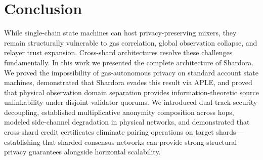 \documentclass[sigconf,nonacm]{acmart}
\begin{document}
\section{Conclusion}
While single-chain state machines can host privacy-preserving mixers, they remain structurally vulnerable to gas correlation, global observation collapse, and relayer trust expansion. Cross-shard architectures resolve these challenges fundamentally. In this work we presented the complete architecture of Shardora. We proved the impossibility of gas-autonomous privacy on standard account state machines, demonstrated that Shardora evades this result via APLE, and proved that physical observation domain separation provides information-theoretic source unlinkability under disjoint validator quorums. We introduced dual-track security decoupling, established multiplicative anonymity composition across hops, modeled side-channel degradation in physical networks, and demonstrated that cross-shard credit certificates eliminate pairing operations on target shards---establishing that sharded consensus networks can provide strong structural privacy guarantees alongside horizontal scalability.
\end{document}

